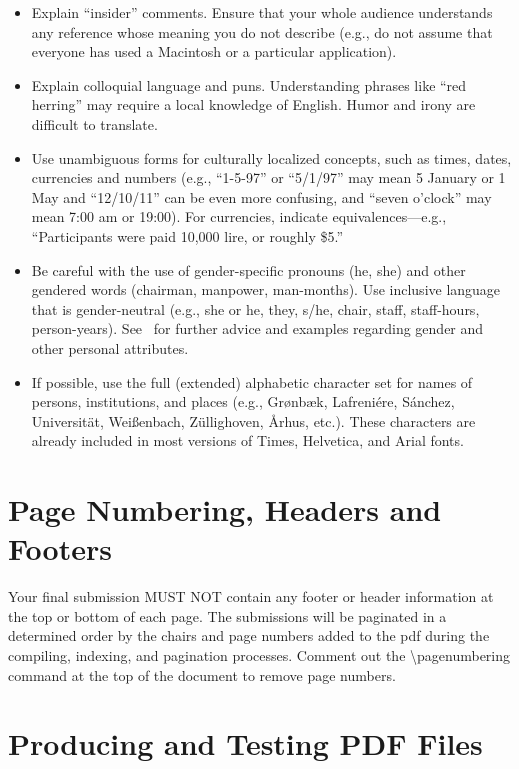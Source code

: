 \documentclass{scsSimAUDPaperFormat}
\begin{document}
\begin{itemize}
\item Explain ``insider'' comments. Ensure that your whole audience understands any reference whose meaning you do not describe (e.g., do not assume that everyone has used a Macintosh or a particular application).
\item Explain colloquial language and puns. Understanding phrases like ``red herring'' may require a local knowledge of English. Humor and irony are difficult to translate.
\item Use unambiguous forms for culturally localized concepts, such as times, dates, currencies and numbers (e.g., ``1-5-97'' or ``5/1/97'' may mean 5 January or 1 May and ``12/10/11'' can be even more confusing, and ``seven o'clock'' may mean 7:00 am or 19:00). For currencies, indicate equivalences---e.g., ``Participants were paid 10,000 lire, or roughly \$5.''
\item Be careful with the use of gender-specific pronouns (he, she) and other gendered words (chairman, manpower, man-months). Use inclusive language that is gender-neutral (e.g., she or he, they, s/he, chair, staff, staff-hours, person-years). See~\cite{Schwartz:1995:GBF} for further advice and examples regarding gender and other personal attributes.
\item If possible, use the full (extended) alphabetic character set for names of persons, institutions, and places (e.g., Gr{\o}nb{\ae}k, Lafreni\'ere, S\'anchez, Universit{\"a}t, Wei{\ss}enbach, Z{\"u}llighoven, \r{A}rhus, etc.). These characters are already included in most versions of Times, Helvetica, and Arial fonts.
\end{itemize}

\section{Page Numbering, Headers and Footers}

Your final submission MUST NOT contain any footer or header information at the top or bottom of each page. The submissions will be paginated in a determined order by the chairs and page numbers added to the pdf during the compiling, indexing, and pagination processes. Comment out the {\textbackslash}pagenumbering command at the top of the document to remove page numbers.

\section{Producing and Testing PDF Files}
\end{document}
